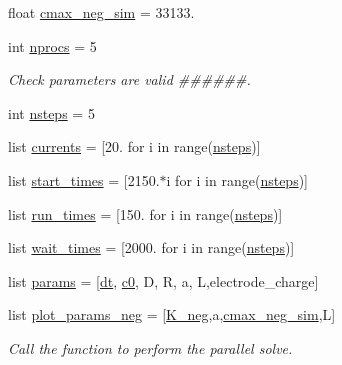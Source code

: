\begin{DoxyCompactItemize}
\item 
float \hyperlink{namespaceuser__input__parallel__simulation_ab7633a5e9c70aabfe6992e4fe521a1f9}{cmax\-\_\-neg\-\_\-sim} = 33133.
\item 
int \hyperlink{namespaceuser__input__parallel__simulation_ad7c4c17cf720ee538e27c02ab356ed6b}{nprocs} = 5
\begin{DoxyCompactList}\small\item\em Check parameters are valid \#\#\#\#\#\#. \end{DoxyCompactList}\item 
int \hyperlink{namespaceuser__input__parallel__simulation_aa2414080b021dbb9b56eeaeedec0ffa2}{nsteps} = 5
\item 
list \hyperlink{namespaceuser__input__parallel__simulation_a216022bdba987f127b6cc081ee78e2bd}{currents} = \mbox{[}20. for i in range(\hyperlink{namespaceuser__input__parallel__simulation_aa2414080b021dbb9b56eeaeedec0ffa2}{nsteps})\mbox{]}
\item 
list \hyperlink{namespaceuser__input__parallel__simulation_a377a515511d37e8c7ac5501847d6485d}{start\-\_\-times} = \mbox{[}2150.$\ast$i for i in range(\hyperlink{namespaceuser__input__parallel__simulation_aa2414080b021dbb9b56eeaeedec0ffa2}{nsteps})\mbox{]}
\item 
list \hyperlink{namespaceuser__input__parallel__simulation_a5a6deb885420d2b81e210e580767b1c1}{run\-\_\-times} = \mbox{[}150. for i in range(\hyperlink{namespaceuser__input__parallel__simulation_aa2414080b021dbb9b56eeaeedec0ffa2}{nsteps})\mbox{]}
\item 
list \hyperlink{namespaceuser__input__parallel__simulation_ae584b229c7b1ea3d8330e6038884ffd3}{wait\-\_\-times} = \mbox{[}2000. for i in range(\hyperlink{namespaceuser__input__parallel__simulation_aa2414080b021dbb9b56eeaeedec0ffa2}{nsteps})\mbox{]}
\item 
list \hyperlink{namespaceuser__input__parallel__simulation_ad4a342a882e80fb0b1b0a80df4b9321b}{params} = \mbox{[}\hyperlink{namespaceuser__input__parallel__simulation_a778e38aa889751afffa2dea6b803e67a}{dt}, \hyperlink{namespaceuser__input__parallel__simulation_aa3407022b348cd058d9808eed482ab4a}{c0}, D, R, a, L,electrode\-\_\-charge\mbox{]}
\item 
list \hyperlink{namespaceuser__input__parallel__simulation_a0861e0e85d9d6139e0cc3cc1cc4fa692}{plot\-\_\-params\-\_\-neg} = \mbox{[}\hyperlink{namespaceuser__input__parallel__simulation_a64d0c5854299798787675bc91586023c}{K\-\_\-neg},a,\hyperlink{namespaceuser__input__parallel__simulation_ab7633a5e9c70aabfe6992e4fe521a1f9}{cmax\-\_\-neg\-\_\-sim},L\mbox{]}
\begin{DoxyCompactList}\small\item\em Call the function to perform the parallel solve. \end{DoxyCompactList}\end{DoxyCompactItemize}


